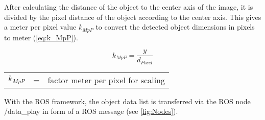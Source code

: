 After calculating the distance of the object to the center axis of the image, it is divided by the pixel distance of the object according to the center axis. This gives a meter per pixel value $k_{MpP}$ to convert the detected object dimensions in pixels to meter (\cref{eq:k_MpP}).

\begin{equation}
	k_{MpP} = \frac{y}{d_{Pixel}}
	\label{eq:k_MpP}
\end{equation}
\begin{table}[!h]
	\begin{center}
		\begin{tabular}{l c l}
			$k_{MpP}$ & = & factor meter per pixel for scaling\\
		\end{tabular}
	\end{center}
\end{table}

With the \ac{ROS} framework, the object data list is transferred via the \ac{ROS} node /data\_play in form of a \ac{ROS} message (see \cref{fig:Nodes}).

